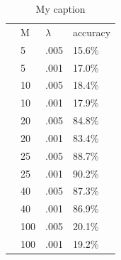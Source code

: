 \documentclass[11pt,letterpaper]{article}
\begin{document}
\begin{table}[]
\centering
\caption{My caption}
\label{my-label}
\begin{tabular}{llll}
 & M   & $\lambda$ & accuracy \\
 & 5   & .005    & 15.6\%   \\
 & 5   & .001    & 17.0\%   \\
 & 10  & .005    & 18.4\%   \\
 & 10  & .001    & 17.9\%   \\
 & 20  & .005    & 84.8\%   \\
 & 20  & .001    & 83.4\%   \\
 & 25  & .005    & 88.7\%   \\
 & 25  & .001    & 90.2\%   \\
 & 40  & .005    & 87.3\%   \\
 & 40  & .001    & 86.9\%   \\
 & 100 & .005    & 20.1\%   \\
 & 100 & .001    & 19.2\%  
\end{tabular}
\end{table}
\end{document}
